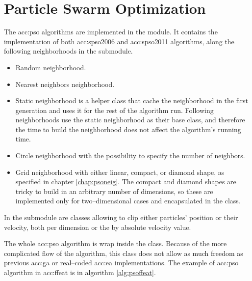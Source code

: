 \section{Particle Swarm Optimization}

The \acrlong{acc:pso} algorithms are implemented in the  module. It contains the implementation of both \acrshort{acc:spso2006} and \acrshort{acc:spso2011} algorithms, along the following neighborhoods in the  submodule.
\begin{itemize}
    \item Random neighborhood.
    \item Nearest neighbors neighborhood.
    \item Static neighborhood is a helper class that cache the neighborhood in the first generation and uses it for the rest of the algorithm run. Following neighborhoods use the static neighborhood as their base class, and therefore the time to build the neighborhood does not affect the algorithm's running time.
    \item Circle neighborhood with the possibility to specify the number of neighbors.
    \item Grid neighborhood with either linear, compact, or diamond shape, as specified in chapter \ref{chap:psoneig}. The compact and diamond shapes are tricky to build in an arbitrary number of dimensions, so these are implemented only for two--dimensional cases and encapsulated in the  class.
\end{itemize}

In the  submodule are classes allowing to clip either particles' position or their velocity, both per dimension or the by absolute velocity value.

The whole \acrshort{acc:pso} algorithm is wrap inside the  class. Because of the more complicated flow of the algorithm, this class does not allow as much freedom as previous \acrshort{acc:ga} or real--coded \acrshort{acc:ea} implementations. The example of \acrshort{acc:pso} algorithm in \acrshort{acc:ffeat} is in algorithm \ref{alg:psoffeat}.

